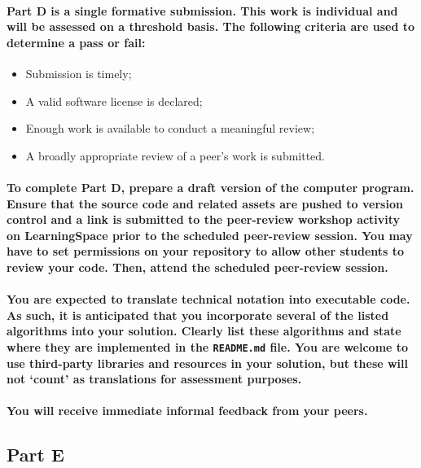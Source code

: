 \documentclass{../../fal_assignment}
\begin{document}
\paragraph{Part D is a \textbf{single formative submission}. This work is \textbf{individual} and will be assessed on a \textbf{threshold} basis. The following criteria are used to determine a pass or fail:}

\begin{itemize}
	\item Submission is timely;
	\item A valid software license is declared;
	\item Enough work is available to conduct a meaningful review;
	\item A broadly appropriate review of a peer's work is submitted.
\end{itemize}

\paragraph{To complete Part D, prepare a draft version of the computer program. Ensure that the source code and related assets are pushed to version control and a link is submitted to the peer-review workshop activity on LearningSpace prior to the scheduled peer-review session. You may have to set permissions on your repository to allow other students to review your code. Then, attend the scheduled peer-review session.}

\paragraph{You are expected to translate technical notation into executable code. As such, it is anticipated that you incorporate several of the listed algorithms into your solution. Clearly list these algorithms and state where they are implemented in the \texttt{README.md} file. You are welcome to use third-party libraries and resources in your solution, but these will not `count' as translations for assessment purposes.}

\paragraph{You will receive immediate \textbf{informal feedback} from your \textbf{peers}.}

\subsection*{Part E}
\end{document}
